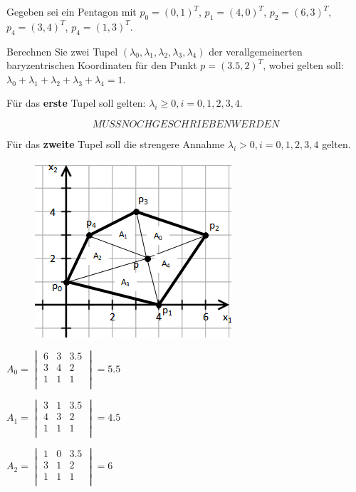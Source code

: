 \documentclass[a4paper,10pt,DIV=14]{article}
\begin{document}
Gegeben sei ein Pentagon mit $p_0 = (0, 1)^T$, $p_1 = (4, 0)^T$, $p_2 = (6, 3)^T$, $p_4 = (3, 4)^T$, $p_4 = (1, 3)^T$.

Berechnen Sie zwei Tupel $(\lambda_0, \lambda_1, \lambda_2, \lambda_3, \lambda_4)$ der verallgemeinerten baryzentrischen Koordinaten für den Punkt $p = (3.5, 2)^T$, wobei gelten soll: $\lambda_0 + \lambda_1 + \lambda_2 + \lambda_3 + \lambda_4 = 1$.

Für das \textbf{erste} Tupel soll gelten: $\lambda_i \geq 0, i = 0,1,2,3,4$.


$$ MUSS NOCH GESCHRIEBEN WERDEN $$


Für das \textbf{zweite} Tupel soll die strengere Annahme $\lambda_i > 0, i = 0,1,2,3,4$ gelten.

\begin{figure}[!htbp]
	\centering
	\includegraphics[]{simplex}
\end{figure}

$A_0 = \begin{vmatrix}
			6 & 3 &  3.5 \\
			3 & 4 &  2   \\
			1 & 1 &  1   \\
		\end{vmatrix} = 5.5 $
		\newline
		\newline
	
$A_1 = \begin{vmatrix}
			3 & 1 &  3.5 \\
			4 & 3 &  2   \\
			1 & 1 &  1   \\
		\end{vmatrix} = 4.5 $
		\newline
		\newline

$A_2 = \begin{vmatrix}
			1 & 0 &  3.5 \\
			3 & 1 &  2   \\
			1 & 1 &  1   \\
		\end{vmatrix} = 6 $
		\newline
		\newline
\end{document}
